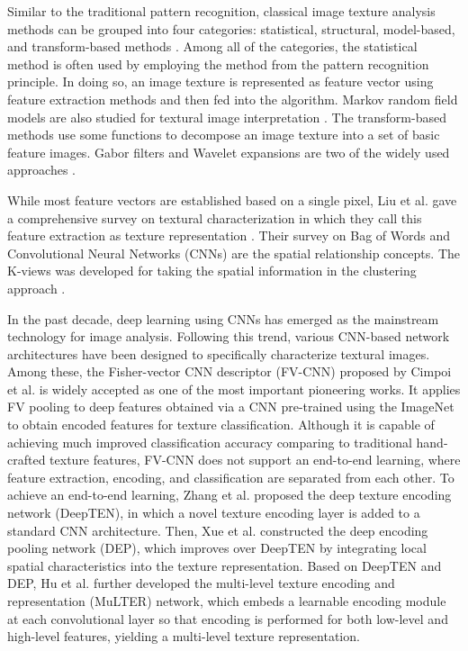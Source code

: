 \documentclass{aci}
\numberwithin{equation}{section}
\begin{document}
Similar to the traditional pattern recognition, classical image texture analysis
methods can be grouped into four categories: statistical, structural,
model-based, and transform-based methods \cite{bharati_image_2004}. Among all of
the categories, the statistical method is often used by employing the method
from the pattern recognition principle.  In doing so, an image texture is
represented as feature vector using feature extraction methods and then fed into
the algorithm. Markov random field models are also studied for textural image
interpretation \cite{hassner_use_1981, cross_markov_1983}. The transform-based
methods use some functions to decompose an image texture into a set of basic
feature images. Gabor filters and Wavelet expansions are two of the widely used
approaches \cite{bovik_multichannel_1990}.

While most feature vectors are established based on a single pixel, Liu et al.
gave a comprehensive survey on textural characterization in which they call this
feature extraction as texture representation \cite{liu_bow_2019}. Their survey
on Bag of Words and Convolutional Neural Networks (CNNs)
\cite{krizhevsky_imagenet_2017} are the spatial relationship concepts. The
K-views was developed for taking the spatial information in the clustering
approach \cite{hung_image_2019}.

In the past decade, deep learning using CNNs has emerged as the mainstream
technology for image analysis. Following this trend, various CNN-based network
architectures have been designed to specifically characterize textural images.
Among these, the Fisher-vector CNN descriptor (FV-CNN) proposed by Cimpoi et
al. \cite{cimpoi_deep_2015} is widely accepted as one of the most important
pioneering works. It applies FV pooling to deep features obtained via a CNN
pre-trained using the ImageNet \cite{krizhevsky_imagenet_2017} to obtain encoded features
for texture classification. Although it is capable of achieving much improved
classification accuracy comparing to traditional hand-crafted texture features,
FV-CNN does not support an end-to-end learning, where feature extraction,
encoding, and classification are separated from each other. To achieve an
end-to-end learning, Zhang et al. \cite{zhang_deep_2017} proposed the deep texture
encoding network (DeepTEN), in which a novel texture encoding layer is added to
a standard CNN architecture. Then, Xue et al. \cite{xue_deep_2018} constructed the
deep encoding pooling network (DEP), which improves over DeepTEN by integrating
local spatial characteristics into the texture representation. Based on DeepTEN
and DEP, Hu et al. \cite{hu_multi_2019} further developed the multi-level texture
encoding and representation (MuLTER) network, which embeds a learnable encoding
module at each convolutional layer so that encoding is performed for both
low-level and high-level features, yielding a multi-level texture
representation.
\end{document}
